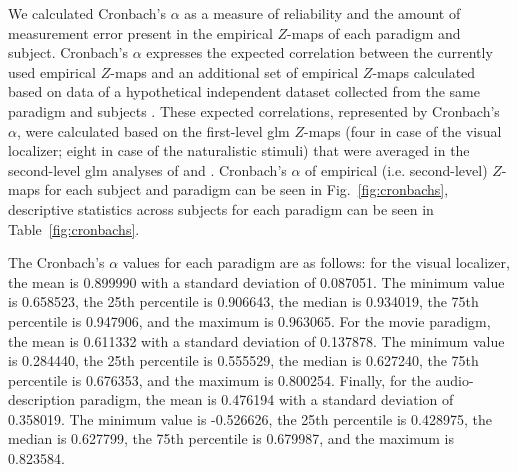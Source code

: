 %
We calculated Cronbach's $\alpha$ as a measure of reliability and the amount of
measurement error \citep{cronbach1951coefficient, cortina1993coefficient}
present in the empirical $Z$-maps of each paradigm and subject.
%
Cronbach's $\alpha$ expresses the expected correlation between the currently
used empirical $Z$-maps and an additional set of empirical $Z$-maps calculated
based on data of a hypothetical independent dataset collected from the same
paradigm and subjects \citep{jiahui2020predicting, jiahui2022cross}.
%
These expected correlations, represented by Cronbach's $\alpha$, were calculated
based on the first-level \ac{glm} $Z$-maps (four in case of the visual
localizer; eight in case of the naturalistic stimuli) that were averaged in the
second-level \ac{glm} analyses of \citet{sengupta2016extension} and
\citet{haeusler2022processing}.
%
Cronbach's $\alpha$ of empirical (i.e. second-level) $Z$-maps for each subject
and paradigm can be seen in Fig.~\ref{fig:cronbachs}, descriptive statistics
across subjects for each paradigm can be seen in Table~\ref{fig:cronbachs}.

%
%




The Cronbach's $\alpha$ values for each paradigm are as follows:
%
for the visual localizer,
%
the mean is 0.899990 with a standard deviation of 0.087051.
%
The minimum value is 0.658523, the 25th percentile is 0.906643, the median is
0.934019, the 75th percentile is 0.947906, and the maximum is 0.963065.
%
For the movie paradigm,
%
the mean is 0.611332 with a standard deviation of 0.137878.
%
The minimum value is 0.284440, the 25th percentile is 0.555529, the median is
0.627240, the 75th percentile is 0.676353, and the maximum is 0.800254.
%
Finally, for the audio-description paradigm, the mean is 0.476194 with a
standard deviation of 0.358019.
%
The minimum value is -0.526626, the 25th percentile is 0.428975, the median is
0.627799, the 75th percentile is 0.679987, and the maximum is 0.823584.


